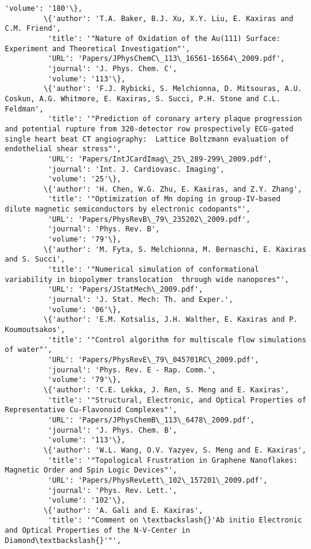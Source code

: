 \documentclass[11pt]{article}
\begin{document}
\begin{Verbatim}[commandchars=\\\{\}]
          'volume': '180'\},
         \{'author': 'T.A. Baker, B.J. Xu, X.Y. Liu, E. Kaxiras and C.M. Friend',
          'title': '"Nature of Oxidation of the Au(111) Surface: Experiment and Theoretical Investigation"',
          'URL': 'Papers/JPhysChemC\_113\_16561-16564\_2009.pdf',
          'journal': 'J. Phys. Chem. C',
          'volume': '113'\},
         \{'author': 'F.J. Rybicki, S. Melchionna, D. Mitsouras, A.U. Coskun, A.G. Whitmore, E. Kaxiras, S. Succi, P.H. Stone and C.L. Feldman',
          'title': '"Prediction of coronary artery plaque progression and potential rupture from 320-detector row prospectively ECG-gated single heart beat CT angiography:  Lattice Boltzmann evaluation of endothelial shear stress"',
          'URL': 'Papers/IntJCardImag\_25\_289-299\_2009.pdf',
          'journal': 'Int. J. Cardiovasc. Imaging',
          'volume': '25'\},
         \{'author': 'H. Chen, W.G. Zhu, E. Kaxiras, and Z.Y. Zhang',
          'title': '"Optimization of Mn doping in group-IV-based dilute magnetic semiconductors by electronic codopants"',
          'URL': 'Papers/PhysRevB\_79\_235202\_2009.pdf',
          'journal': 'Phys. Rev. B',
          'volume': '79'\},
         \{'author': 'M. Fyta, S. Melchionna, M. Bernaschi, E. Kaxiras and S. Succi',
          'title': '"Numerical simulation of conformational variability in biopolymer translocation  through wide nanopores"',
          'URL': 'Papers/JStatMech\_2009.pdf',
          'journal': 'J. Stat. Mech: Th. and Exper.',
          'volume': '06'\},
         \{'author': 'E.M. Kotsalis, J.H. Walther, E. Kaxiras and P. Koumoutsakos',
          'title': '"Control algorithm for multiscale flow simulations of water"',
          'URL': 'Papers/PhysRevE\_79\_045701RC\_2009.pdf',
          'journal': 'Phys. Rev. E - Rap. Comm.',
          'volume': '79'\},
         \{'author': 'C.E. Lekka, J. Ren, S. Meng and E. Kaxiras',
          'title': '"Structural, Electronic, and Optical Properties of Representative Cu-Flavonoid Complexes"',
          'URL': 'Papers/JPhysChemB\_113\_6478\_2009.pdf',
          'journal': 'J. Phys. Chem. B',
          'volume': '113'\},
         \{'author': 'W.L. Wang, O.V. Yazyev, S. Meng and E. Kaxiras',
          'title': '"Topological Frustration in Graphene Nanoflakes: Magnetic Order and Spin Logic Devices"',
          'URL': 'Papers/PhysRevLett\_102\_157201\_2009.pdf',
          'journal': 'Phys. Rev. Lett.',
          'volume': '102'\},
         \{'author': 'A. Gali and E. Kaxiras',
          'title': '"Comment on \textbackslash{}'Ab initio Electronic and Optical Properties of the N-V-Center in Diamond\textbackslash{}'"',

\end{Verbatim}
\end{document}
